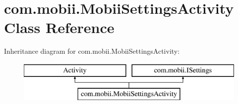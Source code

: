 \hypertarget{classcom_1_1mobii_1_1_mobii_settings_activity}{\section{com.\-mobii.\-Mobii\-Settings\-Activity Class Reference}
\label{classcom_1_1mobii_1_1_mobii_settings_activity}
}
Inheritance diagram for com.\-mobii.\-Mobii\-Settings\-Activity\-:\begin{figure}[H]
\begin{center}
\leavevmode
\includegraphics[height=2.000000cm]{classcom_1_1mobii_1_1_mobii_settings_activity}
\end{center}
\end{figure}
